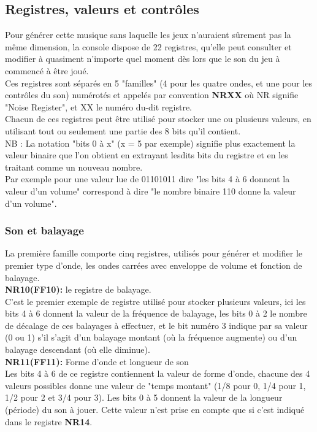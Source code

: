 \documentclass{report}
\begin{document}
\subsection{Registres, valeurs et contrôles} 
	Pour générer cette musique sans laquelle les jeux n'auraient
	sûrement pas la même dimension, la console dispose de 22
	registres, qu'elle peut consulter et modifier à quasiment
	n'importe quel moment dès lors que le son du jeu à commencé à
	être joué.\\
	Ces registres sont séparés en 5 "familles" (4 pour les quatre
	ondes, et une pour les contrôles du son) numérotés et appelés
	par convention \textbf{NRXX} où NR signifie "Noise Register", et XX le
	numéro du-dit registre. \\
	Chacun de ces registres peut être utilisé pour stocker une
	ou plusieurs valeurs, en utilisant tout ou seulement une
	partie des 8 bits qu'il contient.\\

	NB : La notation "bits 0 à x" (x = 5 par exemple) signifie
	plus exactement la valeur binaire que l'on obtient en
	extrayant lesdits bits du registre et en les traitant comme un
	nouveau nombre.\\
	Par exemple pour une valeur lue de 01101011 dire "les bits 4 à
	6 donnent la valeur d'un volume" correspond à dire "le nombre binaire
	110 donne la valeur d'un volume".

	\subsubsection{Son et balayage}
	La première famille comporte cinq registres, utilisés pour
	générer et modifier le premier type d'onde, les ondes carrées
	avec enveloppe de volume et fonction de balayage.\\

	\textbf{NR10(FF10):} le registre de balayage.\\
		C'est le premier exemple de registre utilisé pour
		stocker plusieurs valeurs, ici les bits 4 à 6 donnent
		la valeur de la fréquence de balayage, les bits 0 à 2
		le nombre de décalage de ces balayages à effectuer, et le bit
		numéro 3 indique par sa valeur (0 ou 1) s'il s'agit
		d'un balayage montant (où la fréquence augmente) ou
		d'un balayage descendant (où elle diminue).\\ 
	
	\textbf{NR11(FF11):} Forme d'onde et longueur de son\\
		Les bits 4 à 6 de ce registre contiennent la valeur de
		forme d'onde, chacune des 4 valeurs possibles donne
		une valeur de "temps montant" (1/8 pour 0, 1/4 pour
		1, 1/2 pour 2 et 3/4 pour 3).
		Les bits 0 à 5 donnent la valeur de la longueur
		(période) du son à jouer. Cette valeur n'est prise en
		compte que si c'est indiqué dans le registre \textbf{NR14}.\\
	
\end{document}
